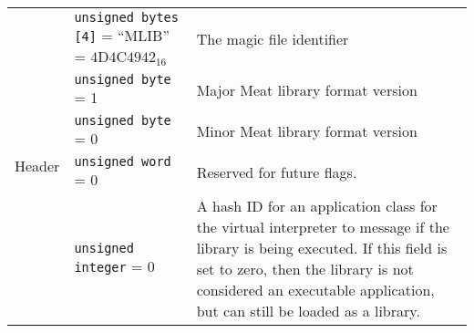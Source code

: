 \begin{center}
  \begin{tabular}{ |l|p{4.5cm}|p{7.5cm}| }
  	\hline
  	\multirow{5}{*}{Header}                   & \texttt{unsigned bytes [4]} = ``MLIB''
    = $\mathrm{4D4C4942}_{16}$ & The
    magic file identifier                                                                                                                                                                                                                                                                                                                                                                                                                                              \\ \cline{2-3}
  	                                          & \texttt{unsigned byte} = 1                                            & Major Meat library format version                                                                                                                                                                                                                                                                                                                                                                                                                                          \\ \cline{2-3}
  	                                          & \texttt{unsigned byte} = 0                                            & Minor Meat library format version                                                                                                                                                                                                                                                                                                                                                                                                                                          \\ \cline{2-3}
  	                                          & \texttt{unsigned word} = 0                                            & Reserved for future flags.                                                                                                                                                                                                                                                                                                                                                                                                                                                 \\ \cline{2-3}
  	                                          & \texttt{unsigned integer} = 0                                         & A hash ID for an application class for the virtual interpreter to message if the library is being executed. If this field is set to zero, then the library is not considered an executable application, but can still be loaded as a library.


\end{tabular}
\end{center}
